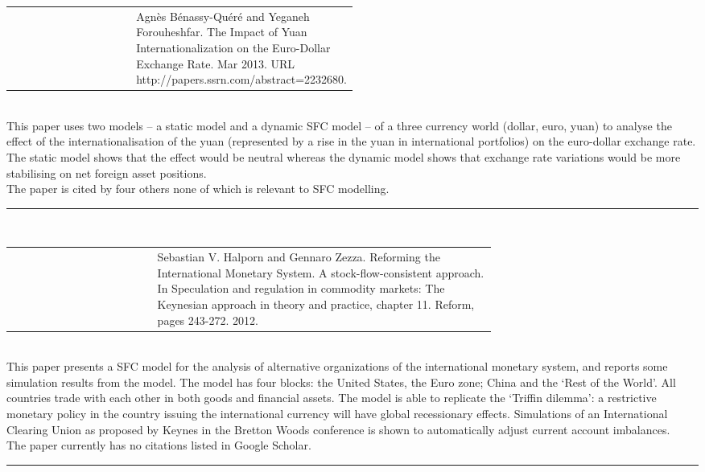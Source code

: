 \documentclass[twoside,a4paper,11pt]{article}
\begin{document}
\begin{tabular}{lp{0.5\linewidth}}
\cite{Benassy-Quere2013}  & Agn\`es B\'enassy-Qu\'er\'e and Yeganeh Forouheshfar. The Impact of Yuan Internationalization on the Euro-Dollar Exchange Rate. Mar 2013. URL http://papers.ssrn.com/abstract=2232680.
\end{tabular}\\[5pt]
This paper uses two models -- a static model and a dynamic SFC model -- of a three currency world (dollar, euro, yuan) to analyse the effect of the internationalisation of the yuan (represented by a rise in the yuan in international portfolios) on the euro-dollar exchange rate. The static model shows that the effect would be neutral whereas the dynamic model shows that exchange rate variations would be more stabilising on net foreign asset positions.  \\[5pt]
The paper is cited by four others none of which is relevant to SFC modelling.
\begin{center}
\rule{10cm}{1pt}   \\[5pt]
\end{center}

\begin{tabular}{lp{0.7\linewidth}}
\cite{Halporn2012} & Sebastian V. Halporn and Gennaro Zezza. Reforming the International Monetary System.
A stock-flow-consistent approach. In Speculation and regulation in commodity
markets: The Keynesian approach in theory and practice, chapter 11. Reform, pages 243-272. 2012.
\end{tabular}\\[5pt]
This paper presents a SFC model for the analysis of alternative organizations of the international monetary system, and reports some simulation results from the model. The model has four blocks: the United States, the Euro zone; China and the ‘Rest of the World’. All countries trade with each other in both goods and financial assets. The model is able to replicate the ‘Triffin dilemma’: a restrictive monetary policy in the country issuing the international currency will have global recessionary effects. Simulations of an International Clearing Union as proposed by Keynes in the Bretton Woods conference is shown to automatically adjust current account imbalances. \\[5pt]
The paper currently has no citations listed in Google Scholar.
\begin{center}
\rule{10cm}{1pt}   \\[5pt]
\end{center}
\end{document}
